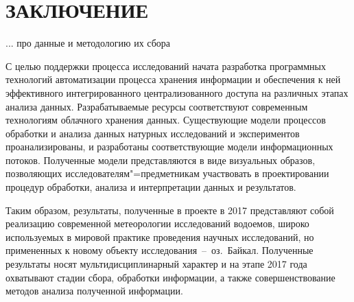 \documentclass[a4paper,12pt,openany,final]{extreport}
\newcommand\theyear{2017}
\begin{document}
\chapter*{ЗАКЛЮЧЕНИЕ}
\label{chap:concl}




... про данные и методологию их сбора

С целью поддержки процесса исследований начата разработка программных технологий автоматизации процесса хранения информации и обеспечения к ней эффективного интегрированного централизованного доступа на различных этапах анализа данных.  Разрабатываемые ресурсы соответствуют современным технологиям облачного хранения данных.  Существующие модели процессов обработки и анализа данных натурных исследований и экспериментов проанализированы, и разработаны соответствующие модели информационных потоков.  Полученные модели представляются в виде визуальных образов, позволяющих исследователям"=предметникам участвовать в проектировании процедур обработки, анализа и интерпретации данных и результатов.

Таким образом, результаты, полученные в проекте в \theyear{} представляют собой реализацию современной метеорологии исследований водоемов, широко используемых в мировой практике проведения научных исследований, но примененных к новому объекту исследования~--~оз.~Байкал.  Полученные результаты носят мультидисциплинарный характер и на этапе \theyear{} года охватывают стадии сбора, обработки информации, а также совершенствование методов анализа полученной информации.

\appendices
\end{document}
